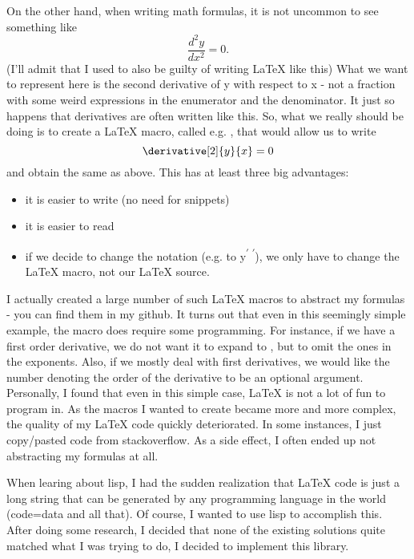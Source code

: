 \documentclass[11pt]{article}
\begin{document}
On the other hand, when writing math formulas, it is not uncommon to see something like
\begin{equation}
\frac{d^2 y}{dx^2} = 0.
\end{equation}
(I'll admit that I used to also be guilty of writing \LaTeX{} like this)
What we want to represent here is the second derivative of y with respect to x - 
not a fraction with some weird expressions in the enumerator and the denominator.
It just so happens that derivatives are often written like this.
So, what we really should be doing is to create a \LaTeX{} macro, called e.g.
\derivative, that would allow us to write
\begin{equation}
\derivative[2]{y}{x} = 0
\end{equation}
and obtain the same as above. This has at least three big advantages:
\begin{itemize}
\item it is easier to write (no need for snippets)
\item it is easier to read
\item if we decide to change the notation (e.g. to y\textsuperscript{\(\prime\) \(\prime\)}), we only have to change the \LaTeX{} macro, not our \LaTeX{} source.
\end{itemize}
I actually created a large number of such \LaTeX{} macros to abstract my formulas - you can find them 
in my github. 
It turns out that even in this seemingly simple example, the 
macro does require some programming. For instance, if we have a first order derivative,
we do not want it to expand to
, but to omit the ones in the exponents. Also, if we mostly deal with first 
derivatives, we would like the number denoting the order of the derivative to 
be an optional argument. 
Personally, I found that even in this simple case, \LaTeX{} is not a lot of fun 
to program in. As the macros I wanted to create became more and more complex, 
the quality of my \LaTeX{} code quickly deteriorated. In some instances, I just copy/pasted 
code from stackoverflow. As a side effect, I often ended up not abstracting my formulas at
all.

When learing about lisp, I had the sudden realization that \LaTeX{} code is just 
a long string that can be generated by any programming language in the world (code=data and 
all that). Of course, I wanted to use lisp to accomplish this.
After doing some research, I decided that none of the existing solutions 
quite matched what I was trying to do, I decided to implement this library.
\end{document}
